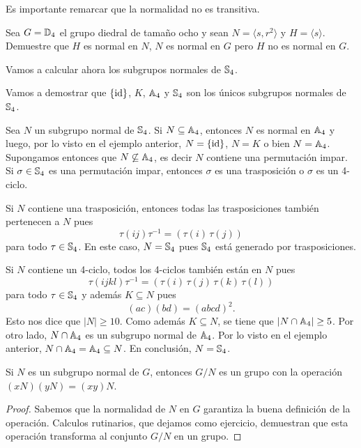 Es importante remarcar que la normalidad no es transitiva.

\begin{exercise}
Sea $G=\mathbb{D}_4$ el grupo diedral de tamaño ocho y sean $N=\langle s,r^2\rangle$ y $H=\langle s\rangle$. Demuestre que 
$H$ es normal en $N$, $N$ es normal en $G$ pero $H$ no es normal en $G$.    
\end{exercise} 
 
Vamos a calcular ahora los subgrupos normales de $\mathbb{S}_4$. 
  
\begin{example}
Vamos a demostrar que $\{\operatorname{id}\}$, $K$, $\mathbb{A}_4$ y $\mathbb{S}_4$ son los únicos subgrupos normales de $\mathbb{S}_4$.

Sea $N$ un subgrupo normal de $\mathbb{S}_4$. Si $N\subseteq\mathbb{A}_4$, entonces $N$ es normal en $\mathbb{A}_4$ y luego, por lo visto en el ejemplo anterior, $N=\{\operatorname{id}\}$, 
$N=K$ o bien $N=\mathbb{A}_4$. Supongamos entonces que $N\not\subseteq\mathbb{A}_4$, es decir $N$ contiene una permutación impar. Si $\sigma\in\mathbb{S}_4$ es una permutación impar, entonces $\sigma$ es una trasposición o $\sigma$ es un 4-ciclo. 

Si $N$ contiene una trasposición, entonces todas las trasposiciones
también pertenecen a $N$ pues
\[
\tau(ij)\tau^{-1}=(\tau(i)\,\tau(j))
\]
para todo $\tau\in\mathbb{S}_4$. En este caso, $N=\mathbb{S}_4$ pues $\mathbb{S}_4$ está generado por trasposiciones.   

Si $N$ contiene un 4-ciclo, todos los 4-ciclos también están en $N$ pues
\[
\tau(ijkl)\tau^{-1}=(\tau(i)\,\tau(j)\,\tau(k)\,\tau(l))
\]
para todo $\tau\in\mathbb{S}_4$ y además $K\subseteq N$ pues
\[
(ac)(bd)=(abcd)^2.
\]
Esto nos dice que $|N|\geq10$. Como además $K\subseteq N$, se tiene que $|N\cap\mathbb{A}_4|\geq 5$. Por otro lado, $N\cap\mathbb{A}_4$ es un subgrupo normal de $\mathbb{A}_4$. 
Por lo visto en el ejemplo anterior, $N\cap\mathbb{A}_4=\mathbb{A}_4\subseteq N$. En conclusión, $N=\mathbb{S}_4$.   
\end{example}

\begin{theorem}
\label{Grupo!cociente}
Si $N$ es un subgrupo normal de $G$, entonces $G/N$ es un grupo con la operación $(xN)(yN)=(xy)N$.  
\end{theorem}

\begin{proof}
Sabemos que la normalidad de $N$ en $G$ garantiza la buena definición de la operación. Calculos rutinarios, que dejamos como ejercicio, demuestran que 
esta operación transforma al conjunto $G/N$ en un grupo. 
\end{proof}

